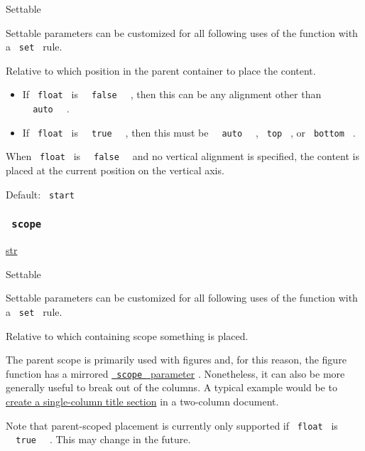 {{ Settable }}

\label{parameters-alignment-settable-tooltip}
Settable parameters can be customized for all following uses of the
function with a \texttt{\ set\ } rule.

Relative to which position in the parent container to place the content.

\begin{itemize}
\tightlist
\item
  If \texttt{\ float\ } is \texttt{\ }{\texttt{\ false\ }}\texttt{\ } ,
  then this can be any alignment other than
  \texttt{\ }{\texttt{\ auto\ }}\texttt{\ } .
\item
  If \texttt{\ float\ } is \texttt{\ }{\texttt{\ true\ }}\texttt{\ } ,
  then this must be \texttt{\ }{\texttt{\ auto\ }}\texttt{\ } ,
  \texttt{\ top\ } , or \texttt{\ bottom\ } .
\end{itemize}

When \texttt{\ float\ } is \texttt{\ }{\texttt{\ false\ }}\texttt{\ }
and no vertical alignment is specified, the content is placed at the
current position on the vertical axis.

Default: \texttt{\ start\ }

\subsubsection{\texorpdfstring{\texttt{\ scope\ }}{ scope }}\label{parameters-scope}

\href{/docs/reference/foundations/str/}{str}

{{ Settable }}

\label{parameters-scope-settable-tooltip}
Settable parameters can be customized for all following uses of the
function with a \texttt{\ set\ } rule.

Relative to which containing scope something is placed.

The parent scope is primarily used with figures and, for this reason,
the figure function has a mirrored
\href{/docs/reference/model/figure/\#parameters-scope}{\texttt{\ scope\ }
parameter} . Nonetheless, it can also be more generally useful to break
out of the columns. A typical example would be to
\href{/docs/guides/page-setup-guide/\#columns}{create a single-column
title section} in a two-column document.

Note that parent-scoped placement is currently only supported if
\texttt{\ float\ } is \texttt{\ }{\texttt{\ true\ }}\texttt{\ } . This
may change in the future.

